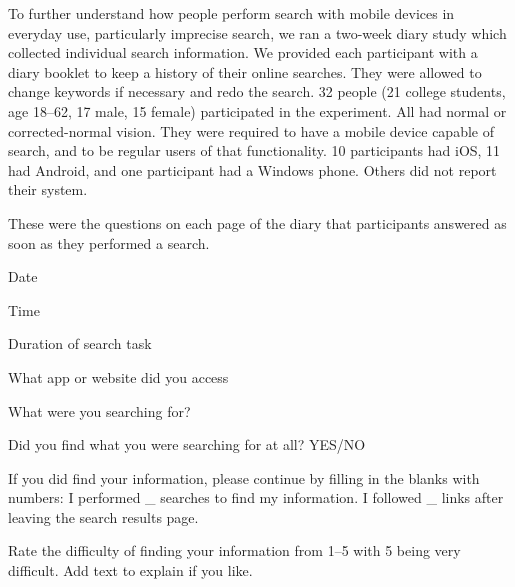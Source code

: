 
To further understand how people perform search with mobile devices in everyday use, particularly imprecise search, we ran a two-week diary study which collected individual search information. We provided each participant with a diary booklet to keep a history of their online searches. They were allowed to change keywords if necessary and redo the search. 32 people (21 college students, age 18--62, 17 male, 15 female) participated in the experiment. All had normal or corrected-normal vision. They were required to have a mobile device capable of search, and to be regular users of that functionality. 10 participants had iOS, 11 had Android, and one participant had a Windows phone. Others did not report their system.




%
These were the questions on each page of the diary that participants answered as soon as they performed a search.
\begin{tight_enumerate}
            \item Date
            \item Time
            \item Duration of search task 
            \item What app or website did you access
            \item What were you searching for?
            \item Did you find what you were searching for at all? YES/NO
            \item If you did find your information, please continue by filling in the blanks with numbers: I performed \_ searches to find my information. I followed \_ links after leaving the search results page.
            \item Rate the difficulty of finding your information from 1--5 with 5 being very difficult. Add text to explain if you like.
\end{tight_enumerate}


